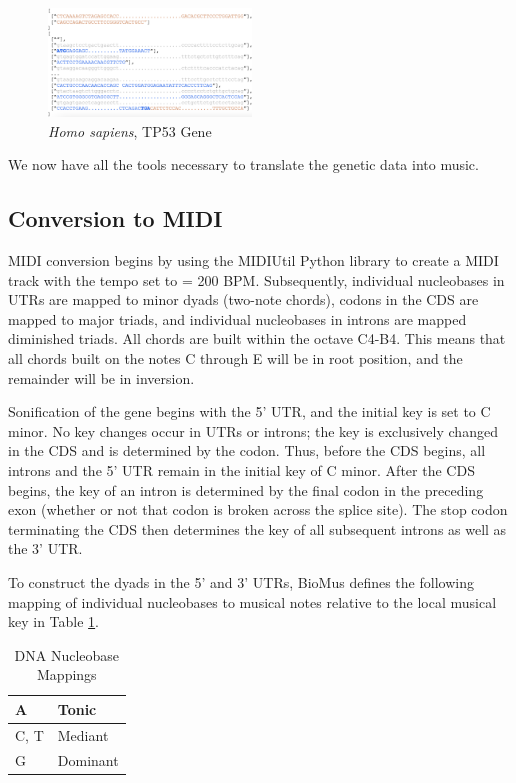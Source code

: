 \documentclass[letterpaper]{article}
\begin{document}
\begin{figure}[h!]
\centering
\includegraphics[width=0.48\textwidth]{images/post_processed_seq_homo_sapiens_tp53_ABBREV}
\vspace{-3mm}
  \caption{\textit{Homo sapiens}, TP53 Gene}\label{fig:post_processed_seq_homo_sapiens_tp53}
  \vspace{-3mm}
\end{figure}

We now have all the tools necessary to translate the genetic data into music.

\subsection{Conversion to MIDI}

MIDI conversion begins by using the MIDIUtil Python library to create a MIDI track with the tempo set to \musQuarter\;= 200 BPM. Subsequently, individual nucleobases in UTRs are mapped to minor dyads (two-note chords), codons in the CDS are mapped to major triads, and individual nucleobases in introns are mapped diminished triads. All chords are built within the octave C4-B4. This means that all chords built on the notes C through E will be in root position, and the remainder will be in inversion.

Sonification of the gene begins with the 5' UTR, and the initial key is set to C minor. No key changes occur in UTRs or introns; the key is exclusively changed in the CDS and is determined by the codon. Thus, before the CDS begins, all introns and the 5' UTR remain in the initial key of C minor. After the CDS begins, the key of an intron is determined by the final codon in the preceding exon (whether or not that codon is broken across the splice site). The stop codon terminating the CDS then determines the key of all subsequent introns as well as the 3' UTR.

To construct the dyads in the 5' and 3' UTRs, BioMus defines the following mapping of individual nucleobases to musical notes relative to the local musical key in Table  \ref{table:nucleobases}.

\begin{table}[h!]
\centering
\begin{tabular}{|l|l|}
\hline
A   & Tonic    \\ \hline
C, T & Mediant  \\ \hline
G   & Dominant \\ \hline
\end{tabular}
\caption{DNA Nucleobase Mappings}
\label{table:nucleobases}
\end{table}
\end{document}
